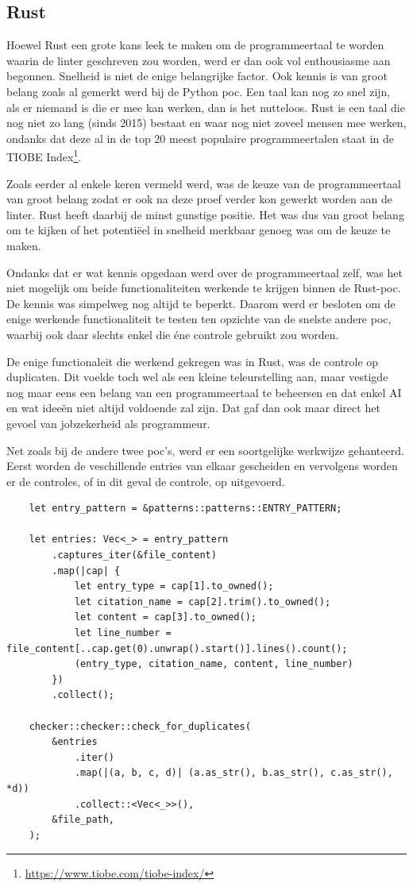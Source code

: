 \subsection{Rust}
Hoewel Rust een grote kans leek te maken om de programmeertaal te worden waarin de linter geschreven zou worden, werd er dan ook vol enthousiasme aan begonnen. Snelheid is niet de enige belangrijke factor. Ook kennis is van groot belang zoals al gemerkt werd bij de Python poc. Een taal kan nog zo snel zijn, als er niemand is die er mee kan werken, dan is het nutteloos. Rust is een taal die nog niet zo lang (sinds 2015) bestaat en waar nog niet zoveel mensen mee werken, ondanks dat deze al in de top 20 meest populaire programmeertalen staat in de TIOBE Index\footnote{\url{https://www.tiobe.com/tiobe-index/}}.

Zoals eerder al enkele keren vermeld werd, was de keuze van de programmeertaal van groot belang zodat er ook na deze proef verder kon gewerkt worden aan de linter. Rust heeft daarbij de minst gunstige positie. Het was dus van groot belang om te kijken of het potentiëel in snelheid merkbaar genoeg was om de keuze te maken.

Ondanks dat er wat kennis opgedaan werd over de programmeertaal zelf, was het niet mogelijk om beide functionaliteiten werkende te krijgen binnen de Rust-poc. De kennis was simpelweg nog altijd te beperkt.
Daarom werd er besloten om de enige werkende functionaliteit te testen ten opzichte van de snelste andere poc, waarbij ook daar slechts enkel die éne controle gebruikt zou worden.

De enige functionaleit die werkend gekregen was in Rust, was de controle op duplicaten. Dit voelde toch wel als een kleine teleurstelling aan, maar vestigde nog maar eens een belang van een programmeertaal te beheersen en dat enkel AI en wat ideeën niet altijd voldoende zal zijn. Dat gaf dan ook maar direct het gevoel van jobzekerheid als programmeur.

Net zoals bij de andere twee poc's, werd er een soortgelijke werkwijze gehanteerd. Eerst worden de veschillende entries van elkaar gescheiden en vervolgens worden er de controles, of in dit geval de controle, op uitgevoerd.
\begin{verbatim}
    let entry_pattern = &patterns::patterns::ENTRY_PATTERN;

    let entries: Vec<_> = entry_pattern
        .captures_iter(&file_content)
        .map(|cap| {
            let entry_type = cap[1].to_owned();
            let citation_name = cap[2].trim().to_owned();
            let content = cap[3].to_owned();
            let line_number = file_content[..cap.get(0).unwrap().start()].lines().count();
            (entry_type, citation_name, content, line_number)
        })
        .collect();

    checker::checker::check_for_duplicates(
        &entries
            .iter()
            .map(|(a, b, c, d)| (a.as_str(), b.as_str(), c.as_str(), *d))
            .collect::<Vec<_>>(),
        &file_path,
    );
\end{verbatim}

